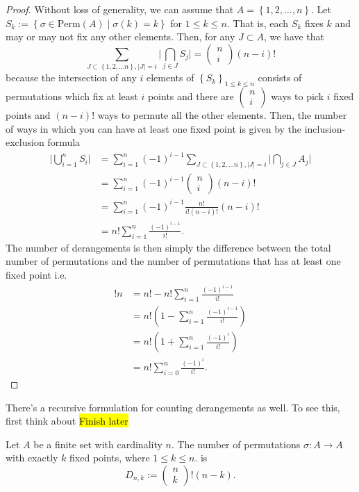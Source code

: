 \begin{proof}
Without loss of generality, we can assume that $A=\left\{ 1,2,\ldots,n\right\} .$
Let $S_{k}:=\left\{ \sigma\in\mathrm{Perm}\left(A\right)\mid\sigma\left(k\right)=k\right\} $
for $1\leq k\leq n.$ That is, each $S_{k}$ fixes $k$ and may or
may not fix any other elements. Then, for any $J\subset A$, we have
that 
\[
\sum_{J\subset\left\{ 1,2,\ldots n\right\} ,\lvert J\rvert=i}\lvert\bigcap_{j\in J}S_{j}\rvert=\left(\begin{array}{c}
n\\
i
\end{array}\right)\left(n-i\right)!
\]
because the intersection of any $i$ elements of $\left\{ S_{k}\right\} _{1\leq k\leq n}$
consists of permutations which fix at least $i$ points and there
are $\left(\begin{array}{c}
n\\
i
\end{array}\right)$ ways to pick $i$ fixed points and $\left(n-i\right)!$ ways to permute
all the other elements. Then, the number of ways in which you can
have at least one fixed point is given by the inclusion-exclusion
formula
\begin{align*}
\lvert\bigcup_{i=1}^{n}S_{i}\rvert & =\sum_{i=1}^{n}\left(-1\right)^{i-1}\sum_{J\subset\left\{ 1,2,\ldots n\right\} ,\lvert J\rvert=i}\lvert\bigcap_{j\in J}A_{j}\rvert\\
 & =\sum_{i=1}^{n}\left(-1\right)^{i-1}\left(\begin{array}{c}
n\\
i
\end{array}\right)\left(n-i\right)!\\
 & =\sum_{i=1}^{n}\left(-1\right)^{i-1}\frac{n!}{i!\left(n-i\right)!}\left(n-i\right)!\\
 & =n!\sum_{i=1}^{n}\frac{\left(-1\right)^{i-1}}{i!}.
\end{align*}
The number of derangements is then simply the difference between the
total number of permutations and the number of permutations that has
at least one fixed point i.e.
\begin{align*}
!n & =n!-n!\sum_{i=1}^{n}\frac{\left(-1\right)^{i-1}}{i!}\\
 & =n!\left(1-\sum_{i=1}^{n}\frac{\left(-1\right)^{i-1}}{i!}\right)\\
 & =n!\left(1+\sum_{i=1}^{n}\frac{\left(-1\right)^{i}}{i!}\right)\\
 & =n!\sum_{i=0}^{n}\frac{\left(-1\right)^{i}}{i!}.
\end{align*}
\end{proof}
\begin{rem*}
There's a recursive formulation for counting derangements as well.
To see this, first think about \hl{Finish later}
\end{rem*}
\begin{cor}
\label{cor:recontresNumbers}Let $A$ be a finite set with cardinality
$n.$ The number of permutations $\sigma:A\to A$ with exactly $k$
fixed points, where $1\leq k\leq n$. is 
\[
D_{n,k}:=\left(\begin{array}{c}
n\\
k
\end{array}\right)!\left(n-k\right).
\]
\end{cor}

